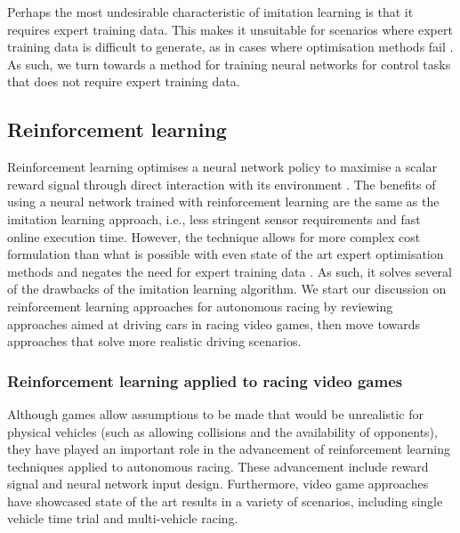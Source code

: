 
Perhaps the most undesirable characteristic of imitation learning is that it requires expert training data.
This makes it unsuitable for scenarios where expert training data is difficult to generate, as in cases where optimisation methods fail \cite{Fuchs2021}.
As such, we turn towards a method for training neural networks for control tasks that does not require expert training data.

\subsection{Reinforcement learning}
\label{sec:reinforcement_learning}

Reinforcement learning optimises a neural network policy to maximise a scalar reward signal through direct interaction with its environment \cite{Plaat_2022}. 
The benefits of using a neural network trained with reinforcement learning are the same as the imitation learning approach, i.e., less stringent sensor requirements and fast online execution time. 
However, the technique allows for more complex cost formulation than what is possible with even state of the art expert optimisation methods and negates the need for expert training data \cite{Fuchs2021}.
As such, it solves several of the drawbacks of the imitation learning algorithm.
We start our discussion on reinforcement learning approaches for autonomous racing by reviewing approaches aimed at driving cars in racing video games, then move towards approaches that solve more realistic driving scenarios.


\subsubsection*{Reinforcement learning applied to racing video games}
Although games allow assumptions to be made that would be unrealistic for physical vehicles (such as allowing collisions and the availability of opponents), they have played an important role in the advancement of reinforcement learning techniques applied to autonomous racing. 
These advancement include reward signal and neural network input design.
Furthermore, video game approaches have showcased state of the art results in a variety of scenarios, including single vehicle time trial and multi-vehicle racing.

